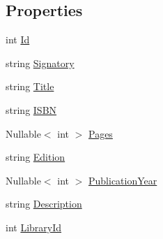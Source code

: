 \subsection*{Properties}
\begin{DoxyCompactItemize}
\item 
int \mbox{\hyperlink{class_easy_library_application_1_1_w_p_f_1_1_model_1_1_book_a643e6223f34bd514223131444a400177}{Id}}
\item 
string \mbox{\hyperlink{class_easy_library_application_1_1_w_p_f_1_1_model_1_1_book_a31223c91f106a78e938d97819e35eaa5}{Signatory}}
\item 
string \mbox{\hyperlink{class_easy_library_application_1_1_w_p_f_1_1_model_1_1_book_a02190a283e996880423b6e06d3342e78}{Title}}
\item 
string \mbox{\hyperlink{class_easy_library_application_1_1_w_p_f_1_1_model_1_1_book_a708e7e7fff155c7fffb71b414de15d0b}{I\+S\+BN}}
\item 
Nullable$<$ int $>$ \mbox{\hyperlink{class_easy_library_application_1_1_w_p_f_1_1_model_1_1_book_ac30bce0563438a8424567ed418493cc7}{Pages}}
\item 
string \mbox{\hyperlink{class_easy_library_application_1_1_w_p_f_1_1_model_1_1_book_a18b6768141a3d2a34300aeff2f57f043}{Edition}}
\item 
Nullable$<$ int $>$ \mbox{\hyperlink{class_easy_library_application_1_1_w_p_f_1_1_model_1_1_book_a99e30f61e90765d2b12b5b78fb67388b}{Publication\+Year}}
\item 
string \mbox{\hyperlink{class_easy_library_application_1_1_w_p_f_1_1_model_1_1_book_ae929b60510a78cc01f81b760acd23c7d}{Description}}
\item 
int \mbox{\hyperlink{class_easy_library_application_1_1_w_p_f_1_1_model_1_1_book_afc12612942653fba6f4e64a40cb18065}{Library\+Id}}

\end{DoxyCompactItemize}
